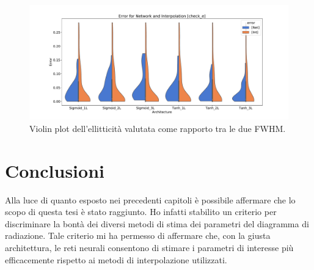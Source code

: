 \documentclass[12pt,a4paper,final]{book}
\begin{document}
\begin{figure}[!ht]
	\centering
    \includegraphics[width=\linewidth]{../figures/violin_plot_check_e.pdf}
    \caption{Violin plot dell'ellitticità valutata come rapporto tra le due FWHM.}
    \label{violin_check}
\end{figure}









\chapter{Conclusioni}\label{conclusioni}
Alla luce di quanto esposto nei precedenti capitoli è possibile affermare che lo scopo di questa tesi è stato raggiunto. Ho infatti stabilito un criterio per discriminare la bontà dei diversi metodi di stima dei parametri del diagramma di radiazione. Tale criterio mi ha permesso di affermare che, con la giusta architettura, le reti neurali consentono di stimare i parametri di interesse più efficacemente rispetto ai metodi di interpolazione utilizzati.

\end{document}
